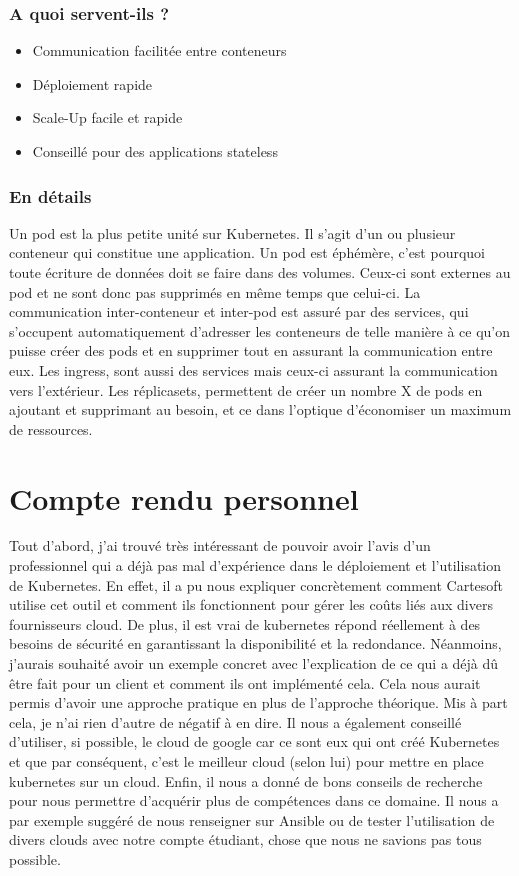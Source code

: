 \documentclass[a4paper]{article}
\begin{document}
\subsubsection{A quoi servent-ils ?}
\begin{itemize}
    \item Communication facilitée entre conteneurs
    \item Déploiement rapide
    \item Scale-Up facile et rapide
    \item Conseillé pour des applications stateless
\end{itemize}

\subsubsection{En détails}
Un pod est la plus petite unité sur Kubernetes. Il s'agit d'un ou plusieur conteneur qui constitue une application. Un pod est éphémère, c'est pourquoi toute écriture de données doit se faire dans des volumes. Ceux-ci sont externes au pod et ne sont donc pas supprimés en même temps que celui-ci. La communication inter-conteneur et inter-pod est assuré par des services, qui s'occupent automatiquement d'adresser les conteneurs de telle manière à ce qu'on puisse créer des pods et en supprimer tout en assurant la communication entre eux. Les ingress, sont aussi des services mais ceux-ci assurant la communication vers l'extérieur. Les réplicasets, permettent de créer un nombre X de pods en ajoutant et supprimant au besoin, et ce dans l'optique d'économiser un maximum de ressources.


\newpage
\section{Compte rendu personnel}
Tout d'abord, j'ai trouvé très intéressant de pouvoir avoir l'avis d'un professionnel qui a déjà pas mal d'expérience dans le déploiement et l'utilisation de Kubernetes. En effet, il a pu nous expliquer concrètement comment Cartesoft utilise cet outil et comment ils fonctionnent pour gérer les coûts liés aux divers fournisseurs cloud. De plus, il est vrai de kubernetes répond réellement à des besoins de sécurité en garantissant la disponibilité et la redondance. Néanmoins, j'aurais souhaité avoir un exemple concret avec l'explication de ce qui a déjà dû être fait pour un client et comment ils ont implémenté cela. Cela nous aurait permis d'avoir une approche pratique en plus de l'approche théorique. Mis à part cela, je n'ai rien d'autre de négatif à en dire. Il nous a également conseillé d'utiliser, si possible, le cloud de google car ce sont eux qui ont créé Kubernetes et que par conséquent, c'est le meilleur cloud (selon lui) pour mettre en place kubernetes sur un cloud. Enfin, il nous a donné de bons conseils de recherche pour nous permettre d'acquérir plus de compétences dans ce domaine. Il nous a par exemple suggéré de nous renseigner sur Ansible ou de tester l'utilisation de divers clouds avec notre compte étudiant, chose que nous ne savions pas tous possible.




\end{document}
